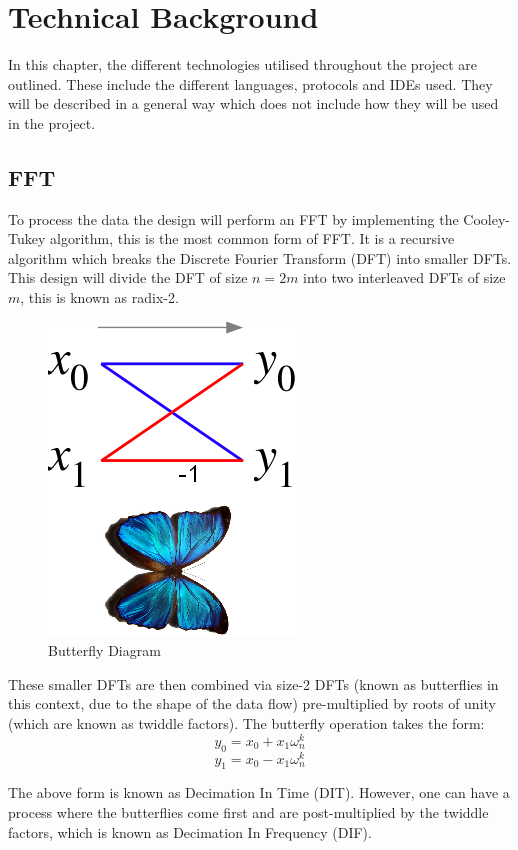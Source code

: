 \documentclass[12pt,a4paper]{report} %
\begin{document}
\chapter{Technical Background}
In this chapter, the different technologies utilised throughout the project are outlined.
These include the different languages, protocols and IDEs used.
They will be described in a general way which does not include how they will be used in the project.
\section{FFT}
To process the data the design will perform an FFT by implementing the Cooley-Tukey algorithm, this is the most common form of FFT.
It is a recursive algorithm which breaks the Discrete Fourier Transform (DFT) into smaller DFTs.
This design will divide the DFT of size $n = 2m$ into two interleaved DFTs of size $m$, this is known as radix-2.
\begin{figure}[h]
\centerline{\includegraphics[scale=0.5]{diagrams/Butterfly-FFT}}
\caption[Butterfly Diagram]{Butterfly Diagram \cite{butterfly}}
\end{figure}

These smaller DFTs are then combined via size-2 DFTs (known as butterflies in this context, due to the shape of the data flow) pre-multiplied by roots of unity (which are known as twiddle factors).
The butterfly operation takes the form:
\begin{equation} 
y_0 = x_0 + x_1\omega^k_n
\end{equation}
\begin{equation} 
y_1 = x_0 - x_1\omega^k_n
\end{equation}

The above form is known as Decimation In Time (DIT).
However, one can have a process where the butterflies come first and are post-multiplied by the twiddle factors, which is known as Decimation In Frequency (DIF).
\end{document}
